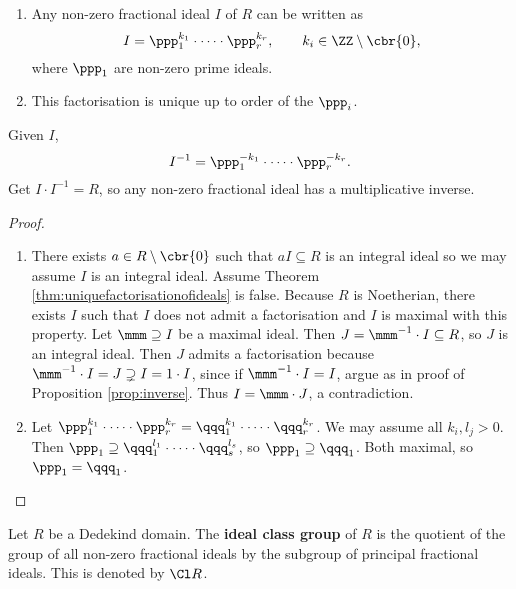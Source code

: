 \pagebreak

\begin{theorem}
\label{thm:uniquefactorisationofideals}
\hfill
\begin{enumerate}
\item Any non-zero fractional ideal $ I $ of $ R $ can be written as
$$ I = \ppp_1^{k_1} \cdot \dots \cdot \ppp_r^{k_r}, \qquad k_i \in \ZZ \setminus \cbr{0}, $$
where $ \ppp_1 $ are non-zero prime ideals.
\item This factorisation is unique up to order of the $ \ppp_i $.
\end{enumerate}
\end{theorem}

\begin{remark*}
Given $ I $,
$$ I^{-1} = \ppp_1^{-k_1} \cdot \dots \cdot \ppp_r^{-k_r}. $$
Get $ I \cdot I^{-1} = R $, so any non-zero fractional ideal has a multiplicative inverse.
\end{remark*}

\begin{proof}
\hfill
\begin{enumerate}
\item There exists $ a \in R \setminus \cbr{0} $ such that $ aI \subseteq R $ is an integral ideal so we may assume $ I $ is an integral ideal. Assume Theorem \ref{thm:uniquefactorisationofideals} is false. Because $ R $ is Noetherian, there exists $ I $ such that $ I $ does not admit a factorisation and $ I $ is maximal with this property. Let $ \mmm \supseteq I $ be a maximal ideal. Then $ J = \mmm^{-1} \cdot I \subseteq R $, so $ J $ is an integral ideal. Then $ J $ admits a factorisation because $ \mmm^{-1} \cdot I = J \supsetneq I = 1 \cdot I $, since if $ \mmm^{-1} \cdot I = I $, argue as in proof of Proposition \ref{prop:inverse}. Thus $ I = \mmm \cdot J $, a contradiction.
\item Let $ \ppp_1^{k_1} \cdot \dots \cdot \ppp_r^{k_r} = \qqq_1^{k_1} \cdot \dots \cdot \qqq_r^{k_r} $. We may assume all $ k_i, l_j > 0 $. Then $ \ppp_1 \supseteq \qqq_1^{l_1} \cdot \dots \cdot \qqq_s^{l_s} $, so $ \ppp_1 \supseteq \qqq_1 $. Both maximal, so $ \ppp_1 = \qqq_1 $.
\end{enumerate}
\end{proof}


\begin{definition}
Let $ R $ be a Dedekind domain. The \textbf{ideal class group} of $ R $ is the quotient of the group of all non-zero fractional ideals by the subgroup of principal fractional ideals. This is denoted by $ \Cl R $.
\end{definition}

